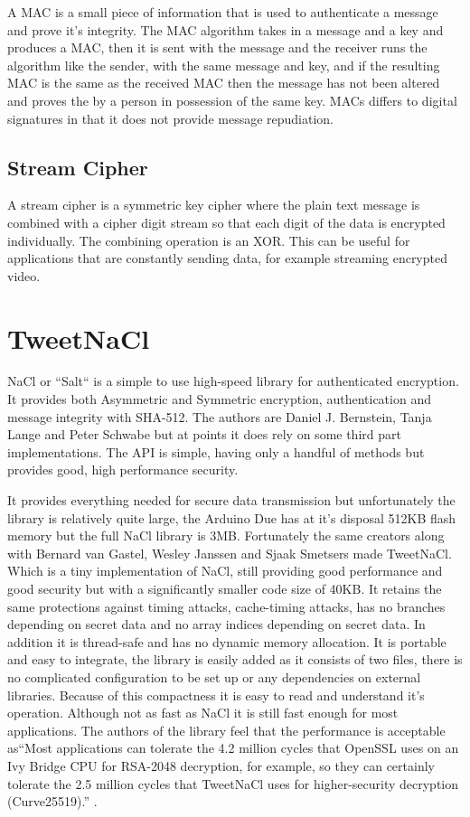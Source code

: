 A MAC is a small piece of information that is used to authenticate a message and prove it's integrity. The MAC algorithm takes in a message and a key and produces a MAC, then it is sent with the message and the receiver runs the algorithm like the sender, with the same message and key, and if the resulting MAC is the same as the received MAC then the message has not been altered and proves the by a person in possession of the same key. MACs differs to digital signatures in that it does not provide message repudiation.

\subsection{Stream Cipher}

A stream cipher is a symmetric key cipher where the plain text message is combined with a cipher digit stream so that each digit of the data is encrypted individually. The combining operation is an XOR. This can be useful for applications that are constantly sending data, for example streaming encrypted video. 

\section{TweetNaCl}

NaCl or ``Salt`` is a simple to use high-speed library for authenticated encryption. It provides both Asymmetric and Symmetric encryption, authentication and message integrity with SHA-512. The authors are Daniel J. Bernstein, Tanja Lange and Peter Schwabe but at points it does rely on some third part implementations. The API is simple, having only a handful of methods but provides good, high performance security.

It provides everything needed for secure data transmission but unfortunately the library is relatively quite large, the Arduino Due has at it's disposal 512KB flash memory but the full NaCl library is 3MB. Fortunately the same creators along with Bernard van Gastel, Wesley Janssen and Sjaak Smetsers made TweetNaCl. Which is a tiny implementation of NaCl, still providing good performance and good security but with a significantly smaller code size of 40KB. It retains the same protections against timing attacks, cache-timing attacks, has no branches depending on secret data and no array indices depending on secret data. In addition it is thread-safe and has no dynamic memory allocation\cite{tweetnacl}. It is portable and easy to integrate, the library is easily added as it consists of two files, there is no complicated configuration to be set up or any dependencies on external libraries. Because of this compactness it is easy to read and understand it's operation. Although not as fast as NaCl it is still fast enough for most applications. The authors of the library feel that the performance is acceptable as``Most applications can tolerate the 4.2 million cycles that OpenSSL uses on an Ivy Bridge CPU for RSA-2048 decryption, for example, so they can certainly tolerate the 2.5 million cycles that TweetNaCl uses for higher-security decryption (Curve25519).'' \cite{tweetnacl3}.


